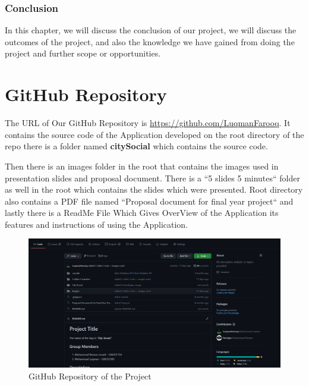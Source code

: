 \subsubsection{Conclusion}
In this chapter, we will discuss the conclusion of our project, we will discuss the outcomes of the project, and also the knowledge we have gained from doing the project and further scope or opportunities.

\section{GitHub Repository}
The URL of Our GitHub Repository is \url{https://github.com/LuqmanFarooq}.
It contains the source code of the Application developed on the root directory of the repo there is a folder named \textbf{citySocial} which contains the source code.

Then there is an images folder in the root that contains the images used in presentation slides and proposal document. There is a ``5 slides 5 minutes`` folder as well in the root which contains the slides which were presented. Root directory also contains a PDF file named ``Proposal document for final year project`` and lastly there is a ReadMe File Which Gives OverView of the Application its features and instructions of using the Application.

\begin{figure}[!htb]
    \centering
    \includegraphics[scale=0.35]{img/github.PNG}
    \caption{GitHub Repository of the Project}
    \label{fig:GitHub Repository of the Project}
\end{figure}
